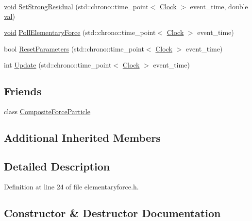 \begin{DoxyCompactItemize}
\item 
\mbox{\hyperlink{glad_8h_a950fc91edb4504f62f1c577bf4727c29}{void}} \mbox{\hyperlink{class_elementary_force_ac25021d38c1d54bf711096ab37a461f6}{Set\+Strong\+Residual}} (std\+::chrono\+::time\+\_\+point$<$ \mbox{\hyperlink{universe_8h_a0ef8d951d1ca5ab3cfaf7ab4c7a6fd80}{Clock}} $>$ event\+\_\+time, double \mbox{\hyperlink{glad_8h_a26942fd2ed566ef553eae82d2c109c8f}{val}})
\item 
\mbox{\hyperlink{glad_8h_a950fc91edb4504f62f1c577bf4727c29}{void}} \mbox{\hyperlink{class_elementary_force_aa5ab479744dbf3e8578f8d2974299ff7}{Poll\+Elementary\+Force}} (std\+::chrono\+::time\+\_\+point$<$ \mbox{\hyperlink{universe_8h_a0ef8d951d1ca5ab3cfaf7ab4c7a6fd80}{Clock}} $>$ event\+\_\+time)
\item 
bool \mbox{\hyperlink{class_elementary_force_a1dedcd23a538b87f71ecd43cb36a6db5}{Reset\+Parameters}} (std\+::chrono\+::time\+\_\+point$<$ \mbox{\hyperlink{universe_8h_a0ef8d951d1ca5ab3cfaf7ab4c7a6fd80}{Clock}} $>$ event\+\_\+time)
\item 
int \mbox{\hyperlink{class_elementary_force_a855c26eb8a542ff633af66940da5f90b}{Update}} (std\+::chrono\+::time\+\_\+point$<$ \mbox{\hyperlink{universe_8h_a0ef8d951d1ca5ab3cfaf7ab4c7a6fd80}{Clock}} $>$ event\+\_\+time)
\end{DoxyCompactItemize}
\subsection*{Friends}
\begin{DoxyCompactItemize}
\item 
class \mbox{\hyperlink{class_elementary_force_a9bc6eb2a4c20ce83728a7c9a31b91f19}{Composite\+Force\+Particle}}
\end{DoxyCompactItemize}
\subsection*{Additional Inherited Members}


\subsection{Detailed Description}


Definition at line 24 of file elementaryforce.\+h.



\subsection{Constructor \& Destructor Documentation}
\mbox{\label{class_elementary_force_a1da5b85cdf3b79f3506dbdc4d877155a}} 
